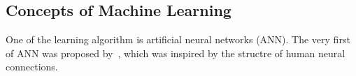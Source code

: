 \subsection{Concepts of Machine Learning}
One of the learning algorithm is artificial neural networks (ANN). The very first of ANN was proposed by~\citet{McCulloch_1943}, which was inspired by the structre of human neural connections. 